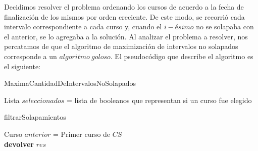 
Decidimos resolver el problema ordenando los cursos de acuerdo a la fecha de finalización de los mismos por orden creciente. De este modo, se recorrió cada intervalo correspondiente a cada curso y, cuando el $i-ésimo$ no se solapaba con el anterior, se lo agregaba a la solución.\newline
Al analizar el problema a resolver, nos percatamos de que el algoritmo de maximización de intervalos no solapados corresponde a un $algoritmo\ goloso$. El pseudocódigo que describe el algoritmo es el siguiente:\newline


\begin{algorithm}[H]
	\SetAlgoLined
	\caption{MaximaCantidadDeIntervalosNoSolapados}
	Lista $seleccionados$ = lista de booleanos que representan si un curso fue elegido
\end{algorithm}

\begin{algorithm}[H]
	\SetAlgoLined
	\caption{filtrarSolapamientos}
	Curso $anterior$ = Primer curso de $CS$\\
	\textbf{devolver} $res$\\	
\end{algorithm}

